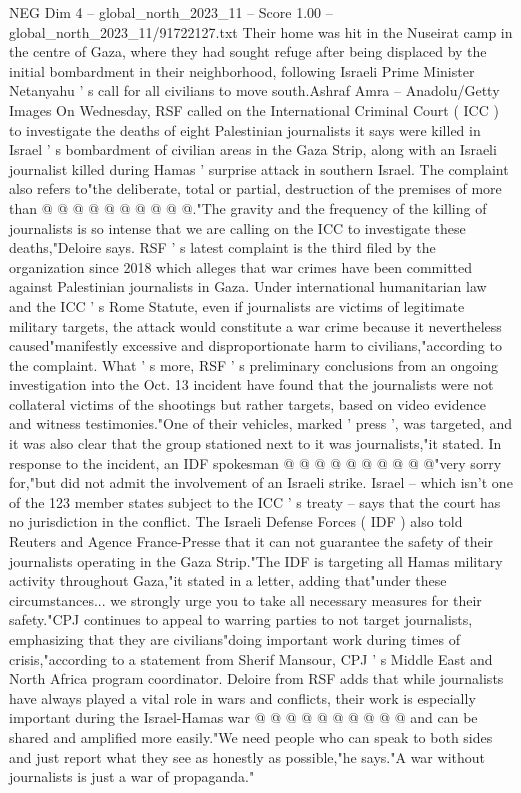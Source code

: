 \begin{textsample}{NEG Dim 4 – global\_north\_2023\_11 – Score 1.00 – global\_north\_2023\_11/91722127.txt}
Their home was hit in the Nuseirat camp in the centre of Gaza, where they had sought refuge after being displaced by the initial bombardment in their neighborhood, following Israeli Prime Minister Netanyahu ' s call for all civilians to move south.Ashraf Amra -- Anadolu/Getty Images On Wednesday, RSF called on the International Criminal Court ( ICC ) to investigate the deaths of eight Palestinian journalists it says were killed in Israel ' s bombardment of civilian areas in the Gaza Strip, along with an Israeli journalist killed during Hamas ' surprise attack in southern Israel.
The complaint also refers to"the deliberate, total or partial, destruction of the premises of more than @ @ @ @ @ @ @ @ @ @."The gravity and the frequency of the killing of journalists is so intense that we are calling on the ICC to investigate these deaths,"Deloire says.
RSF ' s latest complaint is the third filed by the organization since 2018 which alleges that war crimes have been committed against Palestinian journalists in Gaza.
Under international humanitarian law and the ICC ' s Rome Statute, even if journalists are victims of legitimate military targets, the attack would constitute a war crime because it nevertheless caused"manifestly excessive and disproportionate harm to civilians,"according to the complaint.
What ' s more, RSF ' s preliminary conclusions from an ongoing investigation into the Oct. 13 incident have found that the journalists were not collateral victims of the shootings but rather targets, based on video evidence and witness testimonies."One of their vehicles, marked ' press ', was targeted, and it was also clear that the group stationed next to it was journalists,"it stated.
In response to the incident, an IDF spokesman @ @ @ @ @ @ @ @ @ @"very sorry for,"but did not admit the involvement of an Israeli strike.
Israel -- which isn't one of the 123 member states subject to the ICC ' s treaty -- says that the court has no jurisdiction in the conflict.
The Israeli Defense Forces ( IDF ) also told Reuters and Agence France-Presse that it can not guarantee the safety of their journalists operating in the Gaza Strip."The IDF is targeting all Hamas military activity throughout Gaza,"it stated in a letter, adding that"under these circumstances... we strongly urge you to take all necessary measures for their safety."CPJ continues to appeal to warring parties to not target journalists, emphasizing that they are civilians"doing important work during times of crisis,"according to a statement from Sherif Mansour, CPJ ' s Middle East and North Africa program coordinator.
Deloire from RSF adds that while journalists have always played a vital role in wars and conflicts, their work is especially important during the Israel-Hamas war @ @ @ @ @ @ @ @ @ @ and can be shared and amplified more easily."We need people who can speak to both sides and just report what they see as honestly as possible,"he says."A war without journalists is just a war of propaganda."

\end{textsample}
